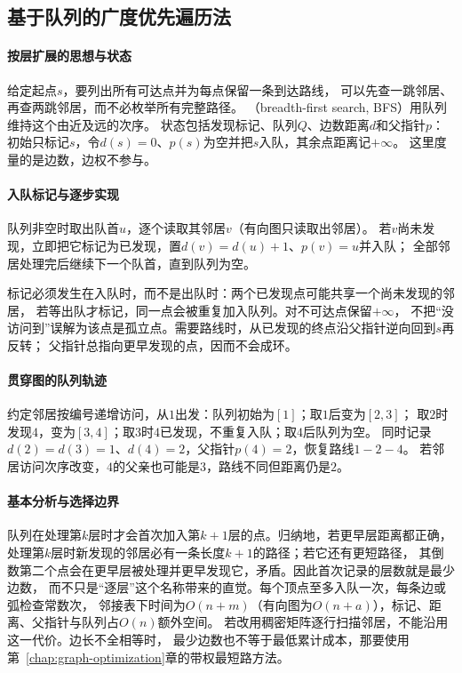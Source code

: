 \subsection{基于队列的广度优先遍历法}
\label{sec:graph-theory-bfs}

\paragraph{按层扩展的思想与状态}
给定起点$s$，要列出所有可达点并为每点保留一条到达路线，
可以先查一跳邻居、再查两跳邻居，而不必枚举所有完整路径。
（breadth-first search, BFS）用队列维持这个由近及远的次序。
状态包括发现标记、队列$Q$、边数距离$d$和父指针$p$：
初始只标记$s$，令$d(s)=0$、$p(s)$为空并把$s$入队，其余点距离记$+\infty$。
这里度量的是边数，边权不参与。

\paragraph{入队标记与逐步实现}
\begin{algorithm}[基于队列的广度优先遍历]
  队列非空时取出队首$u$，逐个读取其邻居$v$（有向图只读取出邻居）。
  若$v$尚未发现，立即把它标记为已发现，置$d(v)=d(u)+1$、$p(v)=u$并入队；
  全部邻居处理完后继续下一个队首，直到队列为空。
\end{algorithm}
标记必须发生在入队时，而不是出队时：两个已发现点可能共享一个尚未发现的邻居，
若等出队才标记，同一点会被重复加入队列。对不可达点保留$+\infty$，
不把“没访问到”误解为该点是孤立点。需要路线时，从已发现的终点沿父指针逆向回到$s$再反转；
父指针总指向更早发现的点，因而不会成环。

\paragraph{贯穿图的队列轨迹}
约定邻居按编号递增访问，从$1$出发：队列初始为$[1]$；取$1$后变为$[2,3]$；
取$2$时发现$4$，变为$[3,4]$；取$3$时$4$已发现，不重复入队；取$4$后队列为空。
同时记录$d(2)=d(3)=1$、$d(4)=2$，父指针$p(4)=2$，恢复路线$1-2-4$。
若邻居访问次序改变，$4$的父亲也可能是$3$，路线不同但距离仍是$2$。

\paragraph{基本分析与选择边界}
队列在处理第$k$层时才会首次加入第$k+1$层的点。归纳地，若更早层距离都正确，
处理第$k$层时新发现的邻居必有一条长度$k+1$的路径；若它还有更短路径，
其倒数第二个点会在更早层被处理并更早发现它，矛盾。因此首次记录的层数就是最少边数，
而不只是“逐层”这个名称带来的直觉。每个顶点至多入队一次，每条边或弧检查常数次，
邻接表下时间为$O(n+m)$（有向图为$O(n+a)$），标记、距离、父指针与队列占$O(n)$额外空间。
若改用稠密矩阵逐行扫描邻居，不能沿用这一代价。边长不全相等时，
最少边数也不等于最低累计成本，那要使用第~\ref{chap:graph-optimization}章的带权最短路方法。

